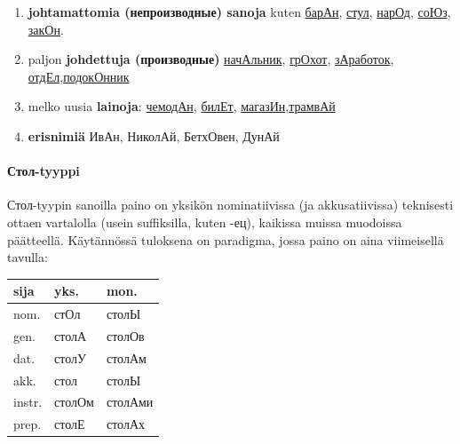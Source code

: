 \documentclass[]{scrartcl}
\providecommand{\tightlist}{%
  \setlength{\itemsep}{0pt}\setlength{\parskip}{0pt}}
\begin{document}
\begin{enumerate}
\def\labelenumi{\arabic{enumi}.}
\tightlist
\item
  \textbf{johtamattomia (непроизводные) sanoja} kuten
  \href{http://ru.wiktionary.org/wiki/\%D0\%B1\%D0\%B0\%D1\%80\%D0\%B0\%D0\%BD}{барАн},
  \href{http://ru.wiktionary.org/wiki/\%D1\%81\%D1\%82\%D1\%83\%D0\%BB}{стул},
  \href{http://ru.wiktionary.org/wiki/\%D0\%BD\%D0\%B0\%D1\%80\%D0\%BE\%D0\%B4}{нарОд},
  \href{http://ru.wiktionary.org/wiki/\%D1\%81\%D0\%BE\%D1\%8E\%D0\%B7}{соЮз},
  \href{http://ru.wiktionary.org/wiki/\%D0\%B7\%D0\%B0\%D0\%BA\%D0\%BE\%D0\%BD}{закОн}.
\item
  paljon \textbf{johdettuja (производные)}
  \href{http://ru.wiktionary.org/wiki/\%D0\%BD\%D0\%B0\%D1\%87\%D0\%B0\%D0\%BB\%D1\%8C\%D0\%BD\%D0\%B8\%D0\%BA}{начАльник},
  \href{http://ru.wiktionary.org/wiki/\%D0\%B3\%D1\%80\%D0\%BE\%D1\%85\%D0\%BE\%D1\%82}{грОхот},
  \href{http://ru.wiktionary.org/wiki/\%D0\%B7\%D0\%B0\%D1\%80\%D0\%B0\%D0\%B1\%D0\%BE\%D1\%82\%D0\%BE\%D0\%BA}{зАработок},
  \href{http://ru.wiktionary.org/wiki/\%D0\%BE\%D1\%82\%D0\%B4\%D0\%B5\%D0\%BB}{отдЕл},\href{http://ru.wiktionary.org/wiki/\%D0\%BF\%D0\%BE\%D0\%B4\%D0\%BE\%D0\%BA\%D0\%BE\%D0\%BD\%D0\%BD\%D0\%B8\%D0\%BA}{подокОнник}
\item
  melko uusia \textbf{lainoja}:
  \href{http://ru.wiktionary.org/wiki/\%D1\%87\%D0\%B5\%D0\%BC\%D0\%BE\%D0\%B4\%D0\%B0\%D0\%BD}{чемодАн},
  \href{http://ru.wiktionary.org/wiki/\%D0\%B1\%D0\%B8\%D0\%BB\%D0\%B5\%D1\%82}{билЕт},
  \href{http://ru.wiktionary.org/wiki/\%D0\%BC\%D0\%B0\%D0\%B3\%D0\%B0\%D0\%B7\%D0\%B8\%D0\%BD}{магазИн},\href{http://ru.wiktionary.org/wiki/\%D1\%82\%D1\%80\%D0\%B0\%D0\%BC\%D0\%B2\%D0\%B0\%D0\%B9}{трамвАй}
\item
  \textbf{erisnimiä} ИвАн, НиколАй, БетхОвен, ДунАй
\end{enumerate}

\paragraph{Стол-tyyppi}\label{ux441ux442ux43eux43b-tyyppi}

Стол-tyypin sanoilla paino on yksikön nominatiivissa (ja akkusatiivissa)
teknisesti ottaen vartalolla (usein suffiksilla, kuten -ец), kaikissa
muissa muodoissa päätteellä. Käytännössä tuloksena on paradigma, jossa
paino on aina viimeisellä tavulla:

\begin{longtable}[c]{@{}lll@{}}
\toprule
sija & yks. & mon.\tabularnewline
\midrule
\endhead
nom. & стОл & столЫ\tabularnewline
gen. & столА & столОв\tabularnewline
dat. & столУ & столАм\tabularnewline
akk. & стол & столЫ\tabularnewline
instr. & столОм & столАми\tabularnewline
prep. & столЕ & столАх\tabularnewline
\bottomrule
\end{longtable}
\end{document}

